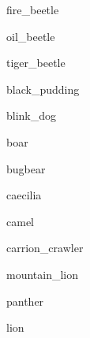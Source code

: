 \documentclass[letterpaper,serif]{module}
\begin{document}

\begin{newmonster}{fire_beetle}\end{newmonster}

\begin{newmonster}{oil_beetle}\end{newmonster}

\begin{newmonster}{tiger_beetle}\end{newmonster}

\begin{newmonster}{black_pudding}\end{newmonster}

\begin{newmonster}{blink_dog}\end{newmonster}

\begin{newmonster}{boar}\end{newmonster}

\begin{newmonster}{bugbear}\end{newmonster}

\begin{newmonster}{caecilia}\end{newmonster}

\begin{newmonster}{camel}\end{newmonster}

\begin{newmonster}{carrion_crawler}\end{newmonster}


\begin{newmonster}{mountain_lion}\end{newmonster}

\begin{newmonster}{panther}\end{newmonster}

\begin{newmonster}{lion}\end{newmonster}
\end{document}
